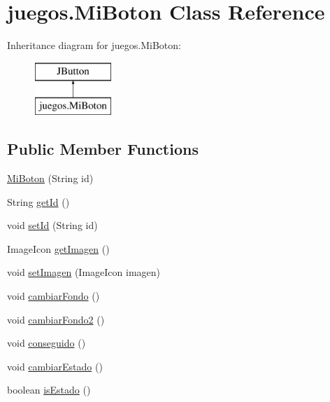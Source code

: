 \hypertarget{classjuegos_1_1_mi_boton}{}\section{juegos.\+Mi\+Boton Class Reference}
\label{classjuegos_1_1_mi_boton}
Inheritance diagram for juegos.\+Mi\+Boton\+:\begin{figure}[H]
\begin{center}
\leavevmode
\includegraphics[height=2.000000cm]{classjuegos_1_1_mi_boton}
\end{center}
\end{figure}
\subsection*{Public Member Functions}
\begin{DoxyCompactItemize}
\item 
\mbox{\hyperlink{classjuegos_1_1_mi_boton_a6db3545e9e3f46f6961567e2e641252a}{Mi\+Boton}} (String id)
\item 
String \mbox{\hyperlink{classjuegos_1_1_mi_boton_ac18af470cca70041df501db863a17fb6}{get\+Id}} ()
\item 
void \mbox{\hyperlink{classjuegos_1_1_mi_boton_aba4f5e21b8d0680b280912a3f842cd22}{set\+Id}} (String id)
\item 
Image\+Icon \mbox{\hyperlink{classjuegos_1_1_mi_boton_a87f8f2a38c98564c16667614dc91fbe9}{get\+Imagen}} ()
\item 
void \mbox{\hyperlink{classjuegos_1_1_mi_boton_ac7be8974a68047bbb7e18514870cd27c}{set\+Imagen}} (Image\+Icon imagen)
\item 
void \mbox{\hyperlink{classjuegos_1_1_mi_boton_a7759c52b7b10ffed1dec384fe767e4b8}{cambiar\+Fondo}} ()
\item 
void \mbox{\hyperlink{classjuegos_1_1_mi_boton_a77fd9b76c6a0137635fbd0c41290d681}{cambiar\+Fondo2}} ()
\item 
void \mbox{\hyperlink{classjuegos_1_1_mi_boton_a41c13283308120b0c5fffdbd356b1874}{conseguido}} ()
\item 
void \mbox{\hyperlink{classjuegos_1_1_mi_boton_a6ecf889e726d59939e2579a5f8493bbe}{cambiar\+Estado}} ()
\item 
boolean \mbox{\hyperlink{classjuegos_1_1_mi_boton_a0cbc4b4feeb4006cc5e6127179c68a09}{is\+Estado}} ()
\end{DoxyCompactItemize}


